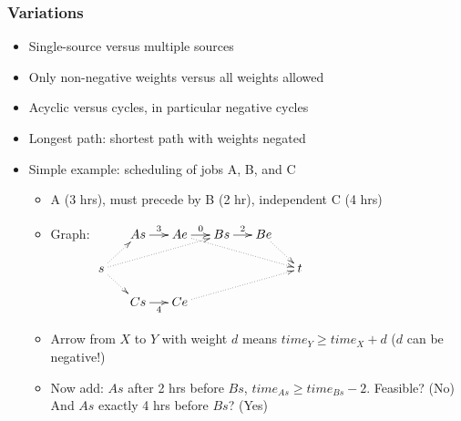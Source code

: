 \documentclass[handout]{beamer}
\begin{document}
\begin{frame}
    \frametitle{Variations}

\begin{itemize}[<+->]
\item Single-source versus multiple sources
\item Only non-negative weights versus all weights allowed
\item Acyclic versus cycles, in particular negative cycles
\item Longest path: shortest path with weights negated
\item Simple example: scheduling of jobs A, B, and C
  \begin{itemize}[<+->]
  \item A (3 hrs), must precede by B (2 hr), independent C (4 hrs)
  \item Graph: $\xymatrix@R=0.5cm@C=0.5cm{
  &As\ar[r]^3&Ae\ar[r]^0\ar@{.>}[rrrd]&Bs\ar[r]^2&Be\ar@{.>}[rd]\\
  s\ar@{.>}[ru]\ar@{.>}[rd]\ar@{.>}[rrru]&&&&&t\\
  &Cs\ar[r]_4&Ce\ar@{.>}[rrru]}$
  \item Arrow from $X$ to $Y$ with weight $d$ means $time_Y \geq time_X +d$ 
  ($d$ can be negative!)
  \item Now add: $As$ after 2 hrs before $Bs$, 
  $time_{As} \geq time_{Bs} -2$. Feasible? (No)
  And $As$ exactly 4 hrs before $Bs$? (Yes)
  \end{itemize}
\end{itemize} 
\end{frame}
\end{document}
